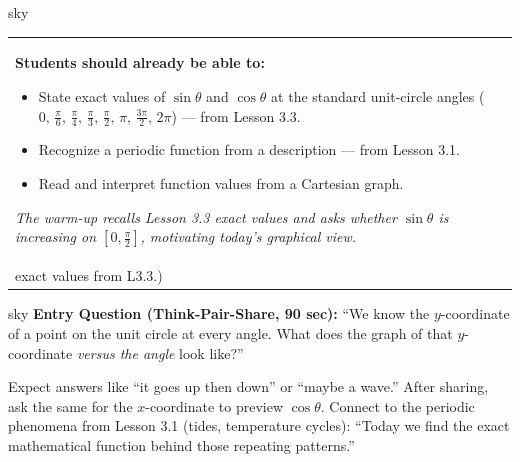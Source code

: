 \documentclass[10pt]{article}
\begin{document}
\begin{skillbox}{sky}
\begin{tabularx}{\linewidth}{@{}X c@{}}
    \begin{minipage}[t]{0.58\linewidth}\vspace{0pt}
        \textbf{Students should already be able to:}
        \begin{itemize}[leftmargin=1.2em, itemsep=3pt]
            \item State exact values of $\sin\theta$ and $\cos\theta$ at the standard
                  unit-circle angles ($0,\,\tfrac{\pi}{6},\,\tfrac{\pi}{4},\,\tfrac{\pi}{3},
                  \,\tfrac{\pi}{2},\,\pi,\,\tfrac{3\pi}{2},\,2\pi$) --- from Lesson 3.3.
            \item Recognize a periodic function from a description --- from Lesson 3.1.
            \item Read and interpret function values from a Cartesian graph.
        \end{itemize}
        \vspace{4pt}
        \textit{The warm-up recalls Lesson 3.3 exact values and asks whether $\sin\theta$ is
        increasing on $[0,\tfrac{\pi}{2}]$, motivating today's graphical view.}
    \end{minipage}
    &
    \begin{minipage}[t]{0.35\linewidth}\vspace{0pt}\centering
        \small\textit{(Warm-up uses unit-circle\\exact values from L3.3.)}
    \end{minipage}
\end{tabularx}
\end{skillbox}

\begin{skillbox}[Hook]{sky}
    \textbf{Entry Question (Think-Pair-Share, 90 sec):} ``We know the $y$-coordinate of a
    point on the unit circle at every angle. What does the graph of that $y$-coordinate
    \emph{versus the angle} look like?''

    \vspace{4pt}
    Expect answers like ``it goes up then down'' or ``maybe a wave.'' After sharing, ask the
    same for the $x$-coordinate to preview $\cos\theta$. Connect to the periodic phenomena
    from Lesson 3.1 (tides, temperature cycles): ``Today we find the exact mathematical
    function behind those repeating patterns.''
\end{skillbox}
\end{document}
